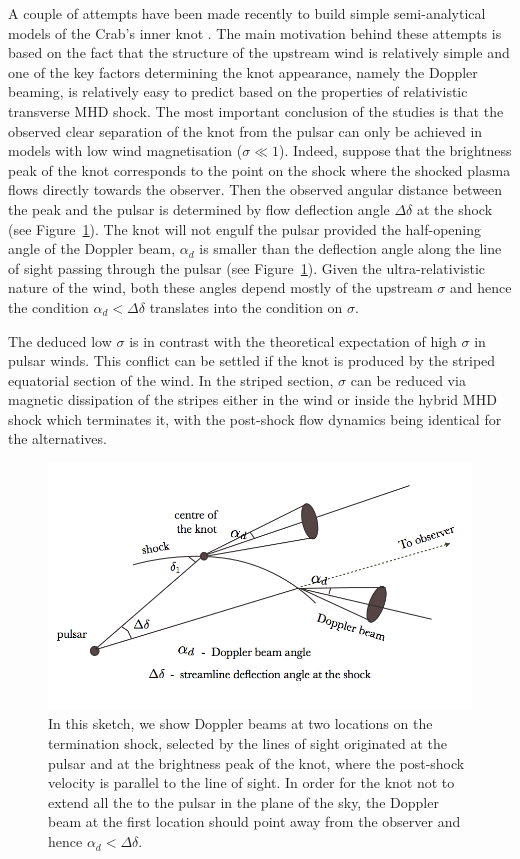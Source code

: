 A couple of attempts have been made recently to build simple semi-analytical models of the Crab’s inner knot \citep{YB-15,LKP-16}. The main motivation behind these attempts is based on the fact that the structure of the upstream wind is relatively simple and one of the key factors determining the knot appearance, namely the Doppler beaming, is relatively easy to predict based on the properties of relativistic transverse MHD shock.  The most important conclusion of the studies is that the observed clear separation of the knot from the pulsar can only be achieved in models with low wind magnetisation ($\sigma \ll 1$).   
Indeed, suppose that the brightness peak of the knot corresponds to the point on the shock where the shocked plasma 
flows directly towards the observer. Then the observed angular distance between the peak and the pulsar is determined 
by flow deflection angle $\Delta\delta$ at the shock (see Figure~\ref{knot-separation}). The knot will not engulf the pulsar provided the half-opening angle of the Doppler beam, $\alpha_d$ is smaller than the deflection angle along the line of sight passing through the pulsar (see Figure~\ref{knot-separation}). Given the ultra-relativistic nature of the wind, both these angles depend mostly of the upstream $\sigma$ and hence the condition $\alpha_d < \Delta\delta$ translates into the condition on $\sigma$.    

The deduced low $\sigma$ is in contrast with the theoretical expectation of high $\sigma$ in pulsar winds. This conflict can be settled if the knot is produced by the striped equatorial section of the wind. In the striped section, $\sigma$ can be reduced via
magnetic dissipation of the stripes either in the wind or inside the hybrid MHD shock which terminates it, with the post-shock flow dynamics being identical for the alternatives.  


\begin{figure}[h!]
\begin{center}
\includegraphics[width=0.7\columnwidth]{figures/f1/f1_original}
\caption{In this sketch, we show Doppler beams at two locations on the termination shock, selected by the lines of sight originated at the pulsar and  at the brightness peak of the knot, where the post-shock velocity is parallel to the line of sight.  
In order for the knot not to extend all the to the pulsar in the plane of the sky,  the Doppler beam at the first location should point away from the observer and hence $\alpha_d < \Delta\delta$.  
}
\end{center}
\label{knot-separation}
\end{figure}

